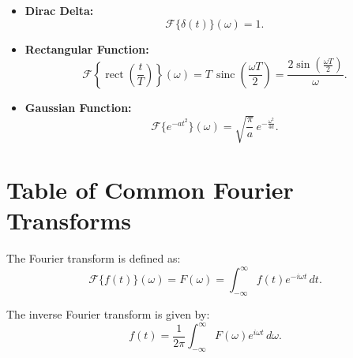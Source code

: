 \documentclass[11pt]{article}
\begin{document}
\begin{itemize}[leftmargin=*, label={--}]
    \item \textbf{Dirac Delta:}
    \[
    \mathcal{F}\{\delta(t)\}(\omega) = 1.
    \]
    
    \item \textbf{Rectangular Function:}
    \[
    \mathcal{F}\left\{\operatorname{rect}\left(\frac{t}{T}\right)\right\}(\omega) = T\, \operatorname{sinc}\left(\frac{\omega T}{2}\right) = \frac{2\sin\left(\frac{\omega T}{2}\right)}{\omega}.
    \]
    
    \item \textbf{Gaussian Function:}
    \[
    \mathcal{F}\{e^{-at^2}\}(\omega) = \sqrt{\frac{\pi}{a}}\, e^{-\frac{\omega^2}{4a}}.
    \]
\end{itemize}

\section{Table of Common Fourier Transforms}

The Fourier transform is defined as:
\begin{equation}
    \mathcal{F}\{f(t)\}(\omega) = F(\omega) = \int_{-\infty}^{\infty} f(t)e^{-i\omega t}\, dt.
\end{equation}

The inverse Fourier transform is given by:
\begin{equation}
    f(t) = \frac{1}{2\pi} \int_{-\infty}^{\infty} F(\omega)e^{i\omega t}\, d\omega.
\end{equation}
\end{document}
